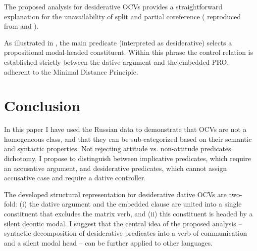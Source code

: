 \documentclass[output=paper,
colorlinks,
citecolor=brown,
newtxmath
]{langscibook}
\begin{document}
The proposed analysis for desiderative OCVs provides a straightforward explanation for the unavailability of split and partial coreference ( reproduced from  and ).

\ea \label{ex27} 
\z
\z

\noindent As illustrated in , the main predicate (interpreted as desiderative) selects a propositional modal-headed constituent. Within this phrase the control relation is established strictly between the dative argument and the embedded PRO, adherent to the Minimal Distance Principle.

\section{Conclusion}\label{s5}

In this paper I have used the Russian data to demonstrate that OCVs are not a homogeneous class, and that they can be sub-categorized based on their semantic and syntactic properties. Not rejecting  attitude vs. non-attitude predicates dichotomy, I propose to distinguish between implicative predicates, which require an accusative argument, and desiderative predicates, which cannot assign accusative case and require a dative controller.

The developed structural representation for desiderative dative OCVs are two-fold: (i) the dative argument and the embedded clause are united into a single constituent that excludes the matrix verb, and (ii) this constituent is headed by a silent deontic modal. I suggest that the central idea of the proposed analysis – syntactic decomposition of desiderative predicates into a verb of communication and a silent modal head – can be further applied to other languages.
\end{document}
